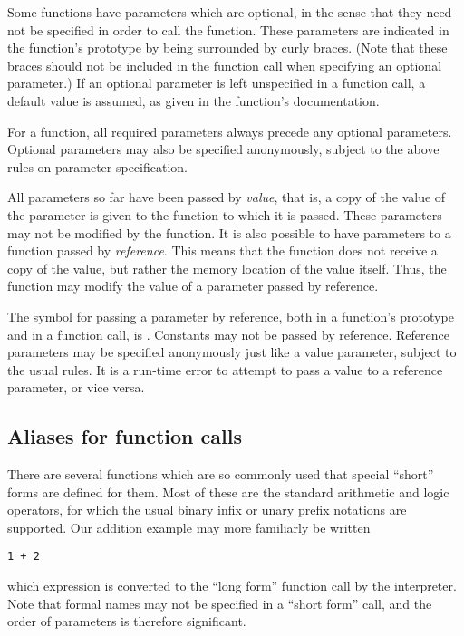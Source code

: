Some functions have parameters which are optional, in the sense that
they need not be specified in order to call the function.  These
parameters are indicated in the function's prototype by being
surrounded by curly braces.  (Note that these braces should not be
included in the function call when specifying an optional parameter.)
If an optional parameter is left unspecified in a function call, a
default value is assumed, as given in the function's documentation.

For a function, all required parameters always precede any optional
parameters.  Optional parameters may also be specified anonymously,
subject to the above rules on parameter specification.

All parameters so far have been passed by {\it value}, that is, a copy
of the value of the parameter is given to the function to which it is
passed.  These parameters may not be modified by the function.  It is
also possible to have parameters to a function passed by {\it
reference}.  This means that the function does not receive a copy of
the value, but rather the memory location of the value itself.  Thus,
the function may modify the value of a parameter passed by reference.

The symbol for passing a parameter by reference, both in a function's
prototype and in a function call, is {\tt <->}.  Constants may not be
passed by reference.  Reference parameters may be specified
anonymously just like a value parameter, subject to the usual rules.
It is a run-time error to attempt to pass a value to a reference
parameter, or vice versa.

\subsection{Aliases for function calls}

There are several functions which are so commonly used that special
``short'' forms are defined for them.  Most of these are the standard
arithmetic and logic operators, for which the usual binary infix or
unary prefix notations are supported.  Our addition example may more
familiarly be written

\begin{verbatim}
1 + 2
\end{verbatim}

\noindent which expression is converted to the ``long form'' function
call by the interpreter.  Note that formal names may not be specified
in a ``short form'' call, and the order of parameters is therefore
significant.


